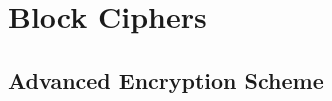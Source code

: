 \section{Block Ciphers}\label{sec:Block_Ciphers}
\begin{definition}\label{def:Block_Cipher}
  
\end{definition}

\subsection{Advanced Encryption Scheme}\label{subsec:AES}
\begin{definition}\label{def:AES}
  
\end{definition}

